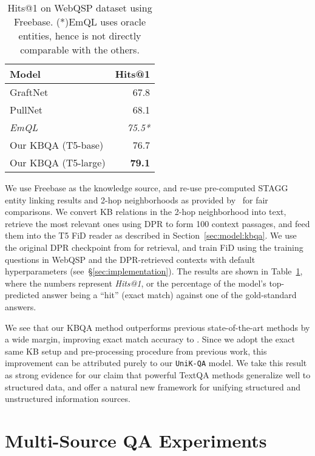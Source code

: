 \documentclass[11pt]{article}
\newcommand{\uniqa}{\texttt{UniK-QA}\xspace}
\newcommand{\secref}[1]{\S\ref{#1}}
\begin{document}
\begin{table}[t]
\begin{center}
\begin{tabular}{lr}
\toprule
\textbf{Model} & \textbf{Hits@1} \\ 
\midrule
GraftNet \cite{sun2018open} & 67.8  \\
PullNet \cite{sun2019pullnet} & 68.1  \\ 
\emph{EmQL~\cite{sun2020faithful}} & \emph{75.5*} \\
\midrule
Our KBQA (T5-base) & 76.7  \\
Our KBQA (T5-large) & \textbf{79.1}  \\
\bottomrule
\end{tabular}
\end{center}
\caption{\label{webqsp} Hits@1 on WebQSP dataset using Freebase. (*)EmQL uses oracle entities, hence is not directly comparable with the others.}
\label{tab:webqsp}
\vspace{-3mm}
\end{table} 
We use Freebase as the knowledge source, and re-use pre-computed STAGG entity linking results and 2-hop neighborhoods as provided by~\citet{sun2018open} for fair comparisons.  We convert KB relations in the 2-hop neighborhood into text, retrieve the most relevant ones using DPR to form 100 context passages, and feed them into the T5 FiD reader as described in Section~\ref{sec:model:kbqa}.
We use the original DPR checkpoint from \citet{DPR} for retrieval, and train FiD using the training questions in WebQSP and the DPR-retrieved contexts with default hyperparameters (see~\secref{sec:implementation}).
The results are shown in Table~\ref{tab:webqsp}, where the numbers represent \emph{Hits@1}, or the percentage of the model's top-predicted answer being a ``hit'' (exact match) against one of the gold-standard answers.

We see that our KBQA method outperforms previous state-of-the-art methods by a wide margin, improving exact match accuracy to .  Since we adopt the exact same KB setup and pre-processing procedure from previous work, this improvement can be attributed purely to our \uniqa{} model.  We take this result as strong evidence for our claim that powerful TextQA methods generalize well to structured data, and offer a natural new framework for unifying structured and unstructured information sources.


 

\section{Multi-Source QA Experiments}\label{sec:experiments}
\end{document}

